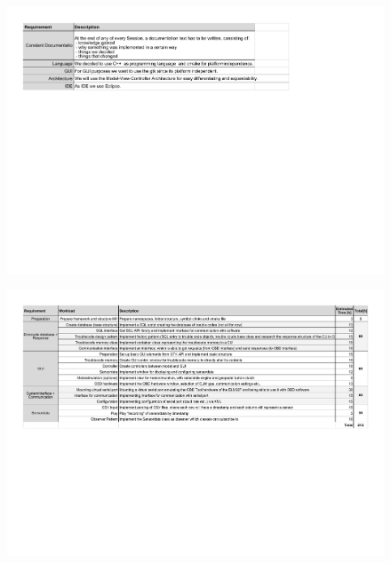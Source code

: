 \begin{landscape}
\begin{figure}[h!]
\includegraphics[width=\paperwidth]{externaldocuments/Requirements_OBDCU-ACQ13_Project_Requirements.pdf} 
\end{figure}
\end{landscape}
\begin{landscape}
\begin{figure}[h!]
\includegraphics[width=\paperwidth]{externaldocuments/Requirements_OBDCU-ENG1_Requirements_Elicitation.pdf} 
\end{figure}
\end{landscape}
